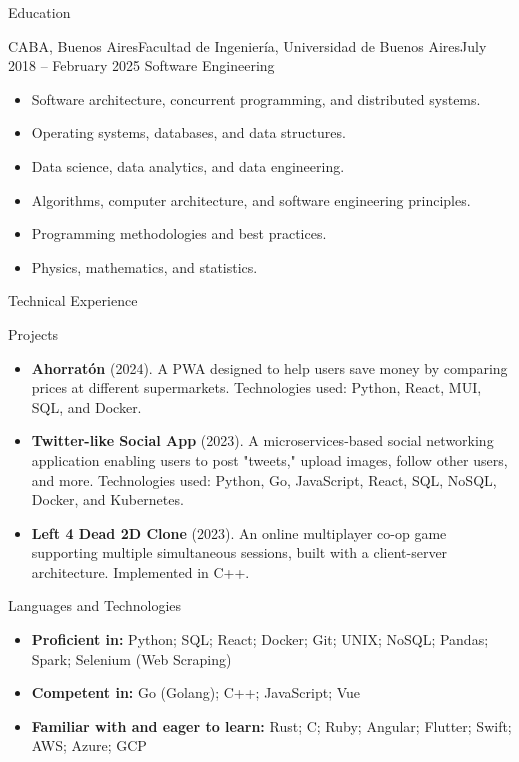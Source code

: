 \documentclass[]{mcdowellcv}
\begin{document}
	\begin{cvsection}{Education}
		\begin{cvsubsection}{CABA, Buenos Aires}{Facultad de Ingeniería, Universidad de Buenos Aires}{July 2018 -- February 2025}
			Software Engineering
			\begin{itemize}
				\item Software architecture, concurrent programming, and distributed systems.
				\item Operating systems, databases, and data structures.
				\item Data science, data analytics, and data engineering.
				\item Algorithms, computer architecture, and software engineering principles.
				\item Programming methodologies and best practices.
				\item Physics, mathematics, and statistics.
			\end{itemize}
		\end{cvsubsection}
	\end{cvsection}	
	
	\begin{cvsection}{Technical Experience}
		\begin{cvsubsection}{Projects}{}{}
			\begin{itemize}
				\item \textbf{Ahorratón} (2024). A PWA designed to help users save money by comparing prices at different supermarkets. Technologies used: Python, React, MUI, SQL, and Docker.
				\item \textbf{Twitter-like Social App} (2023). A microservices-based social networking application enabling users to post "tweets," upload images, follow other users, and more. Technologies used: Python, Go, JavaScript, React, SQL, NoSQL, Docker, and Kubernetes.
				\item \textbf{Left 4 Dead 2D Clone} (2023). An online multiplayer co-op game supporting multiple simultaneous sessions, built with a client-server architecture. Implemented in C++.
			\end{itemize}
		\end{cvsubsection}
	\end{cvsection}
	
	\begin{cvsection}{Languages and Technologies}
		\begin{cvsubsection}{}{}{}
			\begin{itemize}
				\item \textbf{Proficient in:}
				\subitem Python; SQL; React; Docker; Git; UNIX; NoSQL; Pandas; Spark; Selenium (Web Scraping)
				\item \textbf{Competent in:}
				\subitem Go (Golang); C++; JavaScript; Vue
				\item \textbf{Familiar with and eager to learn:}
				\subitem Rust; C; Ruby; Angular; Flutter; Swift; AWS; Azure; GCP
			\end{itemize}
		\end{cvsubsection}
	\end{cvsection}
	
	
\end{document}
